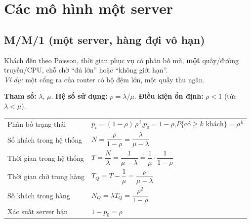 \section{Các mô hình một server}

\subsection{M/M/1 (một server, hàng đợi vô hạn)}

\begin{nhandien}
Khách đến theo Poisson, thời gian phục vụ có phân bố mũ, \textbf{một} quầy/đường truyền/CPU, chỗ chờ “đủ lớn” hoặc “không giới hạn”.\\
\emph{Ví dụ:} một cổng ra của router có bộ đệm lớn, một quầy thu ngân.
\end{nhandien}

\textbf{Tham số:} $\lambda$, $\mu$. \quad \textbf{Hệ số sử dụng:} $\rho = \lambda/\mu$. \quad \textbf{Điều kiện ổn định:} $\rho<1$ (tức $\lambda<\mu$).


\begin{congthuc}
\renewcommand{\arraystretch}{2.1}
\begin{tabular}{@{}l l@{}}
Phân bố trạng thái & $p_i = (1-\rho)\,\rho^{\,i}$,\qquad $p_0 = 1-\rho$,\qquad $P\{\text{có} \ge k \text{ khách}\} = \rho^{\,k}$ \\
Số khách trong hệ thống & $N = \dfrac{\rho}{1-\rho} = \dfrac{\lambda}{\mu-\lambda}$ \\
Thời gian trong hệ thống & $T = \dfrac{N}{\lambda} = \dfrac{1}{\mu-\lambda} = \dfrac{1}{\mu}\cdot\dfrac{1}{1-\rho}$ \\
Thời gian chờ trong hàng & $T_Q = T - \dfrac{1}{\mu} = \dfrac{\rho}{\mu-\lambda}$ \\
Số khách trong hàng & $N_Q = \lambda T_Q = \dfrac{\rho^2}{1-\rho}$ \\
Xác suất server bận & $1-p_0 = \rho$ \\
\end{tabular}
\end{congthuc}

